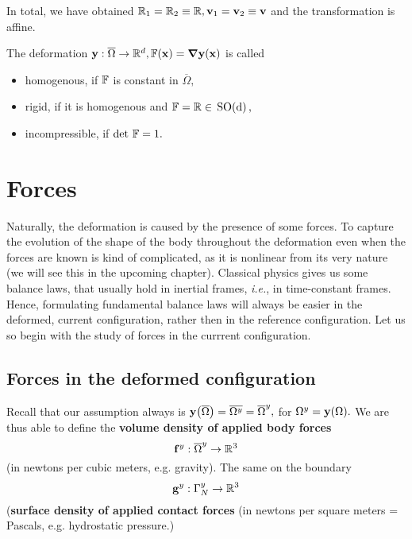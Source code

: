 \documentclass[11pt]{scrartcl} %
\begin{document}
In total, we have obtained $\mathbb{R}_1 = \mathbb{R}_2 \equiv \mathbb{R},\vb{v}_1 = \vb{v}_2 \equiv \vb{v}$ and the transformation is affine.

\begin{definition}
    The deformation $\vb{y}: \overline{\Omega} \to {\mathbb R}^{d}, \mathbb{F}\qty(\vb{x}) = \grad \vb{y}\qty(\vb{x})$ is called 
    \begin{itemize}
	    \item homogenous, if $\mathbb{F}$ is constant in $\overline{\Omega},$
	    \item rigid, if it is homogenous and $\mathbb{F} = \mathbb{R} \in \, \text{SO(d)} \,,$
	    \item incompressible, if $\det\, \mathbb{F} = 1.$
    \end{itemize}
\end{definition}

\section{Forces}
\label{sec:forces}

Naturally, the deformation is caused by the presence of some forces. To capture the evolution of the shape of the body throughout the deformation even when the forces are known is kind of complicated, as it is nonlinear from its very nature (we will see this in the upcoming chapter). Classical physics gives us some balance laws, that usually hold in inertial frames, \textit{i.e.}, in time-constant frames. Hence, formulating fundamental balance laws will always be easier in the deformed, current configuration, rather then in the reference configuration. Let us so begin with the study of forces in the currrent configuration.

\subsection{Forces in the deformed configuration}
\label{sec:forcesdeformed}


Recall that our assumption always is $\vb{y}\qty(\overline{\Omega}) = \overline{\Omega^{y}} = \overline{\Omega}^{y},$ for $\Omega^{y} = \vb{y}\qty(\Omega).$ We are thus able to define the \textbf{volume density of applied body forces}
\[
	\vb{f}^y: \overline{\Omega}^y \to {\mathbb R}^3
\]
(in newtons per cubic meters, e.g. gravity).
The same on the boundary
\[
	\vb{g}^y : \Gamma^y_N \to {\mathbb R}^3
\]
(\textbf{surface density of applied contact forces} (in newtons per square meters = Pascals, e.g. hydrostatic pressure.)
\end{document}
